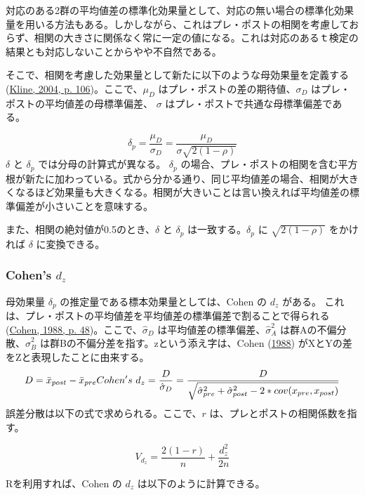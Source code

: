 \documentclass[
  ja=standard, xelatex, base=12pt]{bxjsreport}
\newenvironment{Shaded}{\begin{snugshade}}{\end{snugshade}}
\newcommand{\FunctionTok}[1]{\textcolor[rgb]{0.00,0.00,0.00}{#1}}
\newcommand{\NormalTok}[1]{#1}
\newcommand{\SpecialCharTok}[1]{\textcolor[rgb]{0.00,0.00,0.00}{#1}}
\begin{document}
対応のある2群の平均値差の標準化効果量として、対応の無い場合の標準化効果量を用いる方法もある。しかしながら、これはプレ・ポストの相関を考慮しておらず、相関の大きさに関係なく常に一定の値になる。これは対応のあるｔ検定の結果とも対応しないことからやや不自然である。

そこで、相関を考慮した効果量として新たに以下のような母効果量を定義する(\protect\hyperlink{ref-kline2004}{Kline, 2004, p. 106})。ここで、\(\mu_{D}\) はプレ・ポストの差の期待値、\(σ_D\) はプレ・ポストの平均値差の母標準偏差、 \(σ\) はプレ・ポストで共通な母標準偏差である。

\[
\delta_p=\frac{\mu_{D}}{\sigma_D}=\frac{\mu_{D}}{\sigma\sqrt{2(1-\rho)}}
\] \(\delta\) と \(\delta_p\) では分母の計算式が異なる。 \(\delta_p\) の場合、プレ・ポストの相関を含む平方根が新たに加わっている。式から分かる通り、同じ平均値差の場合、相関が大きくなるほど効果量も大きくなる。相関が大きいことは言い換えれば平均値差の標準偏差が小さいことを意味する。

また、相関の絶対値が0.5のとき、\(\delta\) と \(\delta_p\) は一致する。\(\delta_p\) に \(\sqrt{2(1-\rho)}\) をかければ \(\delta\) に変換できる。

\hypertarget{cohens-d_z}{%
\subsubsection{\texorpdfstring{Cohen's \(d_z\)}{Cohen's d\_z}}\label{cohens-d_z}}

母効果量 \(\delta_p\) の推定量である標本効果量としては、Cohen の \(d_z\) がある。 これは、プレ・ポストの平均値差を平均値差の標準偏差で割ることで得られる(\protect\hyperlink{ref-cohen1988}{Cohen, 1988, p. 48})。ここで、\(\hat\sigma_D\) は平均値差の標準偏差、\(\hat\sigma_A^2\) は群Aの不偏分散、\(\hat\sigma_B^2\) は群Bの不偏分差を指す。zという添え字は、Cohen (\protect\hyperlink{ref-cohen1988}{1988}) がXとYの差をZと表現したことに由来する。 \[
D=\bar{x}_{post}-\bar{x}_{pre}\\
Cohen's~d_z=\frac{D}{\hat\sigma_D}=\frac{D}{\sqrt{\hat\sigma_{pre}^2+\hat\sigma_{post}^2-2*cov(x_{pre}, x_{post})}}
\] 誤差分散は以下の式で求められる。ここで、\(r\) は、プレとポストの相関係数を指す。

\[
V_{d_z} = \dfrac{2(1-r)}{n}+\frac{d_z^2}{2n}
\]

Rを利用すれば、Cohen の \(d_z\) は以下のように計算できる。

\begin{Shaded}
\end{Shaded}
\end{document}
